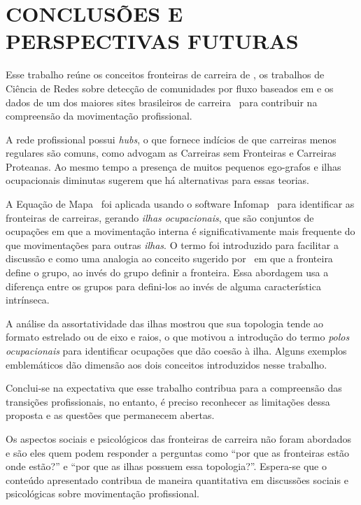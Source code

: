 \documentclass[12pt,a4paper]{article}
\begin{document}
\section{CONCLUSÕES E PERSPECTIVAS FUTURAS} \label{sec:conclusoes}

Esse trabalho reúne os conceitos fronteiras de carreira de , os trabalhos de Ciência de Redes sobre detecção de comunidades por fluxo baseados em \cite{Rosvall2009-sd} e os dados de um dos maiores sites brasileiros de carreira~\cite{VAGAS_Tecnologia2014-yv} para contribuir na compreensão da movimentação profissional.

A rede profissional possui \textit{hubs}, o que fornece indícios de que carreiras menos regulares são comuns, como advogam as Carreiras sem Fronteiras e Carreiras Proteanas. Ao mesmo tempo a presença de muitos pequenos ego-grafos e ilhas ocupacionais diminutas sugerem que há alternativas para essas teorias.

A Equação de Mapa~\cite{Rosvall2009-sd} foi aplicada usando o software Infomap~\cite{Edler2012-hh} para identificar as fronteiras de carreiras, gerando \textit{ilhas ocupacionais}, que são conjuntos de ocupações em que a movimentação interna é significativamente mais frequente do que movimentações para outras \textit{ilhas}. O termo foi introduzido para facilitar a discussão e como uma analogia ao conceito sugerido por~\cite{Abbott1995-ft} em que a fronteira define o grupo, ao invés do grupo definir a fronteira. Essa abordagem usa a diferença entre os grupos para defini-los ao invés de alguma característica intrínseca. 

A análise da assortatividade das ilhas mostrou que sua topologia tende ao formato estrelado ou de eixo e raios, o que motivou a introdução do termo \textit{polos ocupacionais} para identificar ocupações que dão coesão à ilha. Alguns exemplos emblemáticos dão dimensão aos dois conceitos introduzidos nesse trabalho.

Conclui-se na expectativa que esse trabalho contribua para a compreensão das transições profissionais, no entanto, é preciso reconhecer as limitações dessa proposta e as questões que permanecem abertas.

Os aspectos sociais e psicológicos das fronteiras de carreira não foram abordados e são eles quem podem responder a perguntas como \enquote{por que as fronteiras estão onde estão?} e \enquote{por que as ilhas possuem essa topologia?}. Espera-se que o conteúdo apresentado contribua de maneira quantitativa em discussões sociais e psicológicas sobre movimentação profissional.
\end{document}
